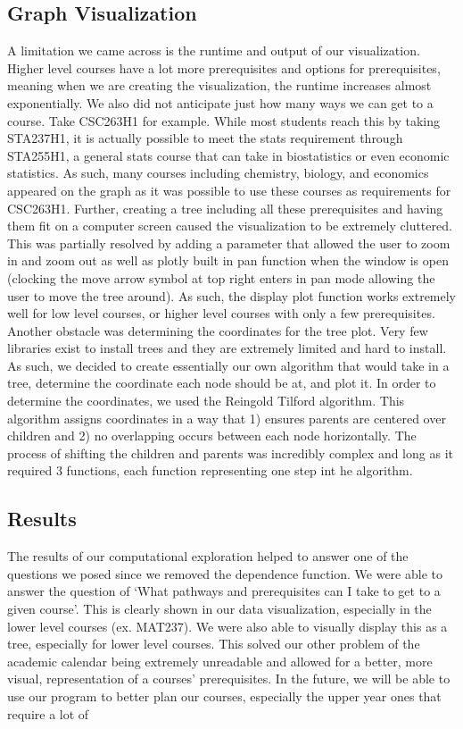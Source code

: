 \documentclass[fontsize=11pt]{article}
\begin{document}
\subsection{Graph Visualization}
A limitation we came across is the runtime and output of our visualization. Higher level courses have a lot more prerequisites and options for prerequisites, meaning when we are creating the visualization, the runtime increases almost exponentially. We also did not anticipate just how many ways we can get to a course. Take CSC263H1 for example. While most students reach this by taking STA237H1, it is actually possible to meet the stats requirement through STA255H1, a general stats course that can take in biostatistics or even economic statistics. As such, many courses including chemistry, biology, and economics appeared on the graph as it was possible to use these courses as requirements for CSC263H1. 
\newline Further, creating a tree including all these prerequisites and having them fit on a computer screen caused the visualization to be extremely cluttered. This was partially resolved by adding a parameter that allowed the user to zoom in and zoom out as well as plotly built in pan function when the window is open (clocking the move arrow symbol at top right enters in pan mode allowing the user to move the tree around). As such, the display plot function works extremely well for low level courses, or higher level courses with only a few prerequisites.
\newline Another obstacle was determining the coordinates for the tree plot. Very few libraries exist to install trees and they are extremely limited and hard to install. As such, we decided to create essentially our own algorithm that would take in a tree, determine the coordinate each node should be at, and plot it. In order to determine the coordinates, we used the Reingold Tilford algorithm. This algorithm assigns coordinates in a way that 1) ensures parents are centered over children and 2) no overlapping occurs between each node horizontally. The process of shifting the children and parents was incredibly complex and long as it required 3 functions, each function representing one step int he algorithm.

\subsection{Results}
The results of our computational exploration helped to answer one of the questions we posed since we removed the dependence function. We were able to answer the question of ‘What pathways and prerequisites can I take to get to a given course’. This is clearly shown in our data visualization, especially in the lower level courses (ex. MAT237). We were also able to visually display this as a tree, especially for lower level courses. This solved our other problem of the academic calendar being extremely unreadable and allowed for a better, more visual, representation of a courses’ prerequisites. In the future, we will be able to use our program to better plan our courses, especially the upper year ones that require a lot of 
\end{document}
